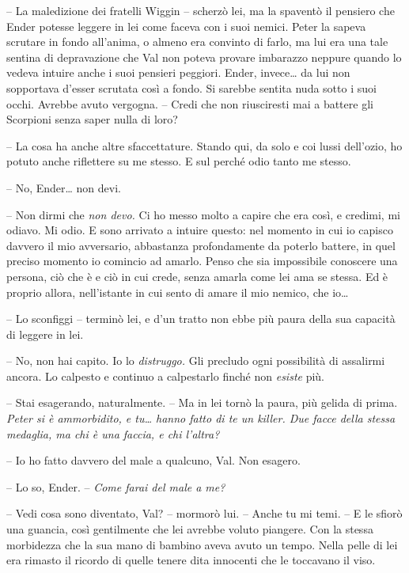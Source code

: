 {-- La maledizione dei fratelli Wiggin -- scherzò lei, ma la spaventò il
	pensiero che Ender potesse leggere in lei come faceva con i suoi nemici.
	Peter la sapeva scrutare in fondo all'anima, o almeno era convinto di
	farlo, ma lui era una tale sentina di depravazione che Val non poteva
	provare imbarazzo neppure quando lo vedeva intuire anche i suoi pensieri
	peggiori. Ender, invece\ldots{} da lui non sopportava d'esser scrutata
	così a fondo. Si sarebbe sentita nuda sotto i suoi occhi. Avrebbe avuto
	vergogna. -- Credi che non riusciresti mai a battere gli Scorpioni senza
	saper nulla di loro?}

{-- La cosa ha anche altre sfaccettature. Stando qui, da solo e coi
	lussi dell'ozio, ho potuto anche riflettere su me stesso. E sul perché
	odio tanto me stesso.}

{-- No, Ender\ldots{} non devi.}

{-- Non dirmi che \emph{non devo.} Ci ho messo molto a capire che era
	così, e credimi, mi odiavo. Mi odio. E sono arrivato a intuire questo:
	nel momento in cui io capisco davvero il mio avversario, abbastanza
	profondamente da poterlo battere, in quel preciso momento io comincio ad
	amarlo. Penso che sia impossibile conoscere una persona, ciò che è e ciò
	in cui crede, senza amarla come lei ama se stessa. Ed è proprio allora,
	nell'istante in cui sento di amare il mio nemico, che io\ldots{}}

{-- Lo sconfiggi -- terminò lei, e d'un tratto non ebbe più paura della
	sua capacità di leggere in lei.}

{-- No, non hai capito. Io lo \emph{distruggo.} Gli precludo ogni
	possibilità di assalirmi ancora. Lo calpesto e continuo a calpestarlo
	finché non \emph{esiste} più.}

{-- Stai esagerando, naturalmente. -- Ma in lei tornò la paura, più
	gelida di prima. \emph{Peter si è ammorbidito, e tu\ldots{} hanno fatto
		di te un killer. Due facce della stessa medaglia, ma chi è una faccia, e
		chi l'altra?}}

{-- Io ho fatto davvero del male a qualcuno, Val. Non esagero.}

{-- Lo so, Ender. -- \emph{Come farai del male a me?}}

{-- Vedi cosa sono diventato, Val? -- mormorò lui. -- Anche tu mi temi.
	-- E le sfiorò una guancia, così gentilmente che lei avrebbe voluto
	piangere. Con la stessa morbidezza che la sua mano di bambino aveva
	avuto un tempo. Nella pelle di lei era rimasto il ricordo di quelle
	tenere dita innocenti che le toccavano il viso.}

